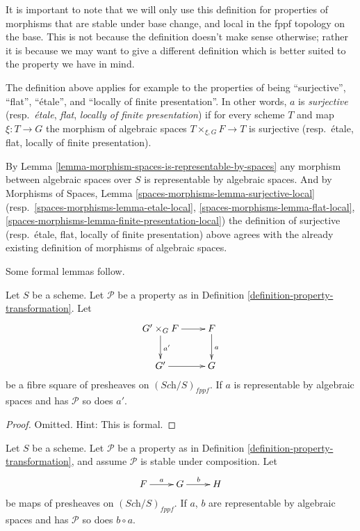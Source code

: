 \noindent
It is important to note that we will only use this definition for
properties of morphisms that are stable under base change, and
local in the fppf topology on the base. This is
not because the definition doesn't make sense otherwise; rather it
is because we may want to give a different definition which is
better suited to the property we have in mind.

\medskip\noindent
The definition above applies for example to the properties of being
``surjective'', ``flat'', ``\'etale'', and ``locally of finite presentation''.
In other words, $a$ is {\it surjective} (resp.\ {\it \'etale}, {\it flat},
{\it locally of finite presentation})
if for every scheme $T$ and map $\xi : T \to G$
the morphism of algebraic spaces $T \times_{\xi, G} F \to T$
is surjective (resp.\ \'etale, flat, locally of finite presentation).

\medskip\noindent
By
Lemma \ref{lemma-morphism-spaces-is-representable-by-spaces}
any morphism between algebraic spaces over $S$ is representable by algebraic
spaces. And by
Morphisms of Spaces,
Lemma \ref{spaces-morphisms-lemma-surjective-local}
(resp.\ \ref{spaces-morphisms-lemma-etale-local},
\ref{spaces-morphisms-lemma-flat-local},
\ref{spaces-morphisms-lemma-finite-presentation-local})
the definition of surjective (resp.\ \'etale, flat,
locally of finite presentation)
above agrees with the already existing definition of morphisms
of algebraic spaces.

\medskip\noindent
Some formal lemmas follow.

\begin{lemma}
\label{lemma-base-change-transformation-property}
Let $S$ be a scheme.
Let $\mathcal{P}$ be a property as in
Definition \ref{definition-property-transformation}.
Let
$$
\xymatrix{
G' \times_G F \ar[r] \ar[d]^{a'} & F \ar[d]^a \\
G' \ar[r] & G
}
$$
be a fibre square of presheaves on $(\textit{Sch}/S)_{fppf}$.
If $a$ is representable by algebraic spaces and has $\mathcal{P}$
so does $a'$.
\end{lemma}

\begin{proof}
Omitted. Hint: This is formal.
\end{proof}

\begin{lemma}
\label{lemma-composition-transformation-property}
Let $S$ be a scheme.
Let $\mathcal{P}$ be a property as in
Definition \ref{definition-property-transformation},
and assume $\mathcal{P}$ is stable under composition.
Let
$$
\xymatrix{
F \ar[r]^a & G \ar[r]^b & H
}
$$
be maps of presheaves on $(\textit{Sch}/S)_{fppf}$.
If $a$, $b$ are representable by algebraic spaces and has
$\mathcal{P}$ so does $b \circ a$.
\end{lemma}

